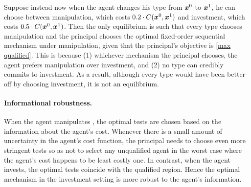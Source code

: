 Suppose instead now when the agent changes his type from $\boldsymbol{x}^0$ to $\boldsymbol{x}^1$, he can choose between  manipulation, which costs $0.2\cdot C(\boldsymbol{x}^0,\boldsymbol{x}^1)$ and investment, which costs $0.5\cdot C(\boldsymbol{x}^0,\boldsymbol{x}^1)$.
Then the only equilibrium is such that every type chooses manipulation and the principal chooses the optimal fixed-order sequential mechanism under manipulation, given that the principal's objective is \ref{max qualified}. 
This is because (1) whichever mechanism the principal chooses, the agent prefers manipulation over investment, and (2) no type can credibly commits to investment. 
As a result, although every type would have been better-off by choosing investment, it is not an equilibrium.



\paragraph{Informational robustness.}
When the agent manipulates , the optimal tests are chosen based on the information about the agent's cost.
Whenever there is a small amount of uncertainty in the agent's cost function,  the principal needs to choose even more stringent tests so as not to select any unqualified agent in the worst case where the agent's cost happens to be least costly one.
In contrast, when the agent invests, the optimal tests coincide with the qualified region. 
Hence the optimal mechanism in the investment setting is more robust to the agent's information.




